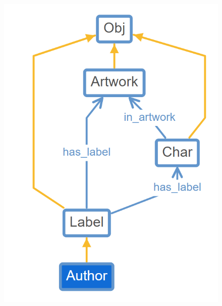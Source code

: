 \documentclass{beamer}
\begin{document}
\begin{frame}{}
    \begin{figure}[l]
        \centering
        \includegraphics[height=.8\textheight]{pic/protege.png}
    \end{figure}
\end{frame}
\end{document}
